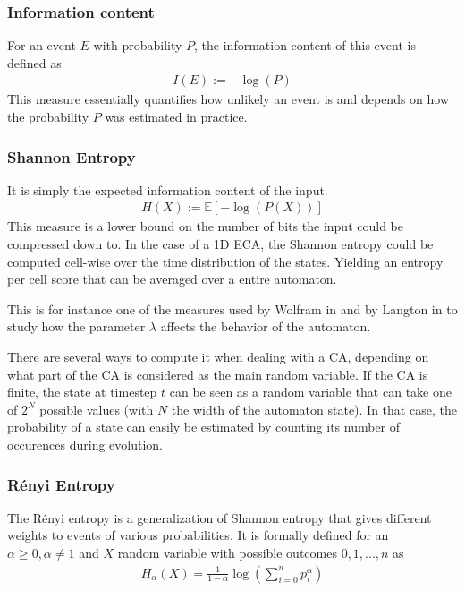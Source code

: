 \subsubsection{Information content}
For an event $E$ with probability $P$, the information content of this event is
defined as
\begin{align*}
  I(E) := -\log(P)
\end{align*}
This measure essentially quantifies how unlikely an event is and depends on how
the probability $P$ was estimated in practice.

\subsubsection{Shannon Entropy}
It is simply the expected information content of the input.
\begin{align*}
  H(X) := \mathbb{E}[-\log(P(X))]
\end{align*}
This measure is a lower bound on the number of bits the input could be
compressed down to. In the case of a 1D ECA, the Shannon entropy could be
computed cell-wise over the time distribution of the states. Yielding an entropy
per cell score that can be averaged over a entire automaton.

This is for instance one of the measures used by Wolfram in
\parencite{wolframStatisticalMechanicsCellular1983} and by Langton in
\parencite{langtonComputationEdgeChaos1990} to study how the parameter $\lambda$ affects
the behavior of the automaton.

There are several ways to compute it when dealing with a CA, depending on what
part of the CA is considered as the main random variable. If the CA is finite,
the state at timestep $t$ can be seen as a random variable that can take one of
$2^N$ possible values (with $N$ the width of the automaton state). In that case,
the probability of a state can easily be estimated by counting its number of
occurences during evolution.

\subsubsection{Rényi Entropy}
The Rényi entropy is a generalization of Shannon entropy that gives different
weights to events of various probabilities. It is formally defined for an
$\alpha \geq 0, \alpha \neq 1$ and $X$ random variable with possible outcomes
$0, 1, ..., n$ as
\begin{align*}
  H_\alpha(X) = \frac{1}{1-\alpha} \log\left(\sum_{i=0}^np_i^\alpha\right)
\end{align*}

